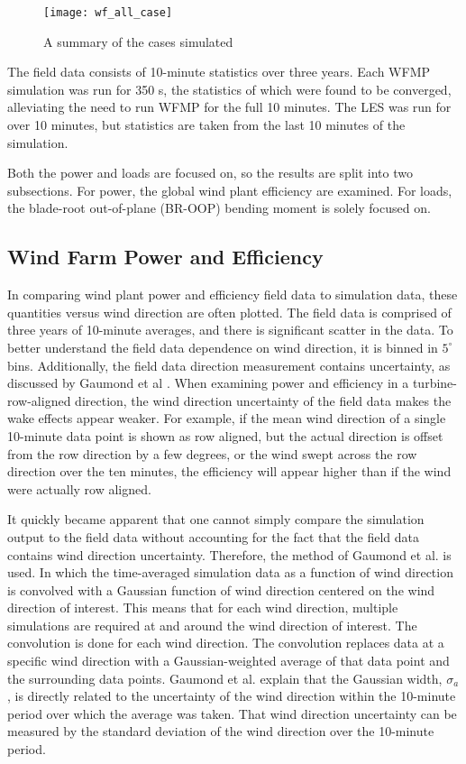 \documentclass{umthesis}
\begin{document}
\begin{figure}
  \centering
  \texttt{[image: wf\_all\_case]}
  \caption{A summary of the cases simulated}\label{fig:wf_all_case}
\end{figure}

The field data consists of 10-minute statistics over three years. Each WFMP simulation was run for 350 s, the statistics of which were found to be converged, alleviating the need to run WFMP for the full 10 minutes. The LES was run for over 10 minutes, but statistics are taken from the last 10 minutes of the simulation.

Both the power and loads are focused on, so the results are split into two subsections. For power, the global wind plant efficiency are examined. For loads, the blade-root out-of-plane (BR-OOP) bending moment is solely focused on.


\subsection{Wind Farm Power and Efficiency}
In comparing wind plant power and efficiency field data to simulation data, these quantities versus wind direction are often plotted. The field data is comprised of three years of 10-minute averages, and there is significant scatter in the data. To better understand the field data dependence on wind direction, it is binned in $5^\circ$ bins. Additionally, the field data direction measurement contains uncertainty, as discussed by Gaumond et al \cite{Gaumond}. When examining power and efficiency in a turbine-row-aligned direction, the wind direction uncertainty of the field data makes the wake effects appear weaker. For example, if the mean wind direction of a single 10-minute data point is shown as row aligned, but the actual direction is offset from the row direction by a few degrees, or the wind swept across the row direction over the ten minutes, the efficiency will appear higher than if the wind were actually row aligned.

It quickly became apparent that one cannot simply compare the simulation output to the field data without accounting for the fact that the field data contains wind direction uncertainty. Therefore, the method of Gaumond et al.\cite{Gaumond} is used. In which the time-averaged simulation data as a function of wind direction is convolved with a Gaussian function of wind direction centered on the wind direction of interest. This means that for each wind direction, multiple simulations are required at and around the wind direction of interest. The convolution is done for each wind direction. The convolution replaces data at a specific wind direction with a Gaussian-weighted average of that data point and the surrounding data points. Gaumond et al. explain that the Gaussian width, $\sigma_a$, is directly related to the uncertainty of the wind direction within the 10-minute period over which the average was taken. That wind direction uncertainty can be measured by the standard deviation of the wind direction over the 10-minute period.
\end{document}
